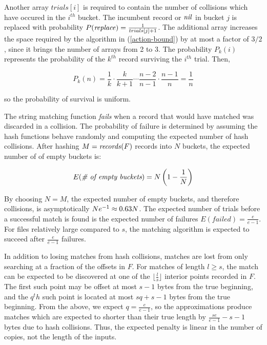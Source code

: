 \documentclass{llncs}
\begin{document}
Another array $trials[i]$ is required to contain the number of
collisions which have occured in the $i^{th}$ bucket.  The incumbent
record or $\textrm{\emph{nil}}$ in bucket $j$ is replaced with probability
$P(\textrm{\emph{replace}}) = \frac{1}{trials[j]+1}$.  The additional
array increases the space required by the algorithm in
(\ref{action-bound}) by at most a factor of $3/2$, since it brings the
number of arrays from 2 to 3.  The probability $P_k(i)$ represents the
probability of the $k^{th}$ record surviving the $i^{th}$ trial.
Then,

\begin{equation}
P_k(n) = \frac{1}{k} \cdot \frac{k}{k+1} \cdots \frac{n-2}{n-1} \cdot \frac{n-1}{n} = \frac{1}{n}
\end{equation}

\noindent so the probability of survival is uniform.

The string matching function \emph{fails} when a record that would
have matched was discarded in a collision.  The probability of failure
is determined by assuming the hash functions behave randomly and
computing the expected number of hash collisions.  After hashing $M =
\textrm{\emph{records}}(F)$ records into $N$ buckets, the expected number of of empty
buckets is:

\begin{equation}
E(\emph{\# of empty buckets}) = N \left( 1 - \frac{1}{N} \right)
\end{equation}

\noindent By choosing $N=M$, the expected number of empty buckets, and
therefore collisions, is asymptotically $N e^{-1} \approx 0.63 N$.
The expected number of trials before a successful match is found is
the expected number of failures $E(failed) = \frac{e}{e-1}$.  For
files relatively large compared to $s$, the matching algorithm is
expected to succeed after $\frac{e}{e-1}$ failures.

In addition to losing matches from hash collisions, matches are lost
from only searching at a fraction of the offsets in $F$.  For matches
of length $l \ge s$, the match can be expected to be discovered at one
of the $\lfloor \frac{l}{s} \rfloor$ interior points recorded in $F$.
The first such point may be offset at most $s-1$ bytes from the true
beginning, and the $q^th$ such point is located at most $s q + s - 1$
bytes from the true beginning.  From the above, we expect $q =
\frac{e}{e-1}$, so the approximations produce matches which are
expected to shorter than their true length by $\frac{s e}{e-1} - s -
1$ bytes due to hash collisions.  Thus, the expected penalty is linear
in the number of copies, not the length of the inputs.
\end{document}

